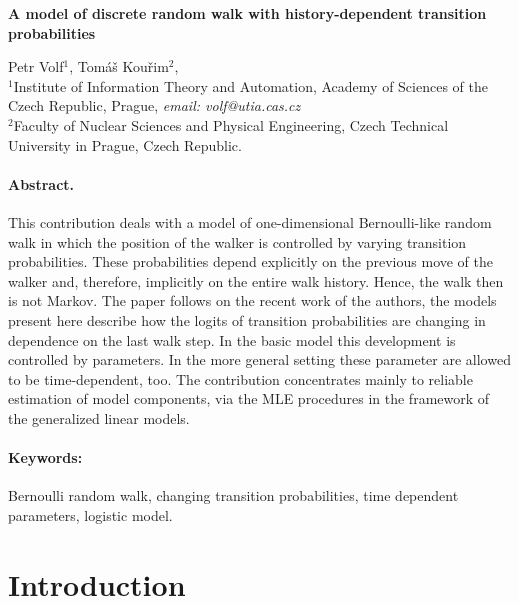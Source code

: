 \documentclass[11pt]{article}
\begin{document}
\begin{center}
  {\Large \bf A model of discrete random walk with
  history-dependent transition probabilities}

\medskip
    Petr Volf$^1$, Tom\'{a}\v{s} Kou\v{r}im$^2$,
 \smallskip\\
   {\small $^1$Institute of Information Theory and Automation, Academy of Sciences of the
  Czech Republic, Prague, {\em email: volf@utia.cas.cz}\\  
  $^2$Faculty of Nuclear Sciences and Physical Engineering,
  Czech Technical University in Prague, Czech Republic.}

\end{center}

\paragraph{Abstract.} This contribution deals with a model of
one-dimensional Bernoulli-like random
walk in which the position of the walker is controlled by varying transition
probabilities. These probabilities depend explicitly on the previous move
of the walker and, therefore, implicitly on the entire walk history. Hence, the walk then is not Markov.
The paper follows on the recent work of the authors, the models present
here describe how the logits of transition probabilities are changing
in dependence on the last walk step. In the basic
model this development is controlled by parameters. In the more general setting
these parameter are allowed to be time-dependent, too.
The contribution concentrates mainly to reliable estimation of model components,
via the MLE procedures in the framework of the generalized linear models.

\paragraph{Keywords:} Bernoulli random walk, changing transition probabilities,
time dependent parameters, logistic model.

\section{Introduction}
\end{document}

